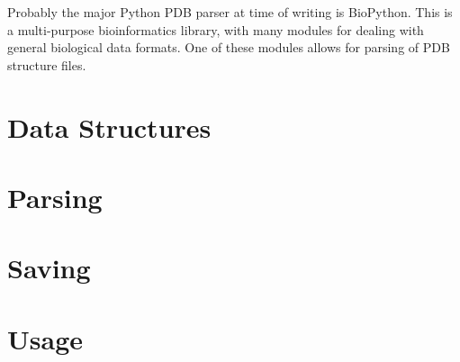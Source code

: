 Probably the major Python PDB parser at time of writing is BioPython. This is a multi-purpose bioinformatics library, with many modules for dealing with general biological data formats. One of these modules allows for parsing of PDB structure files.

\section{Data Structures}

\section{Parsing}

\section{Saving}

\section{Usage}

